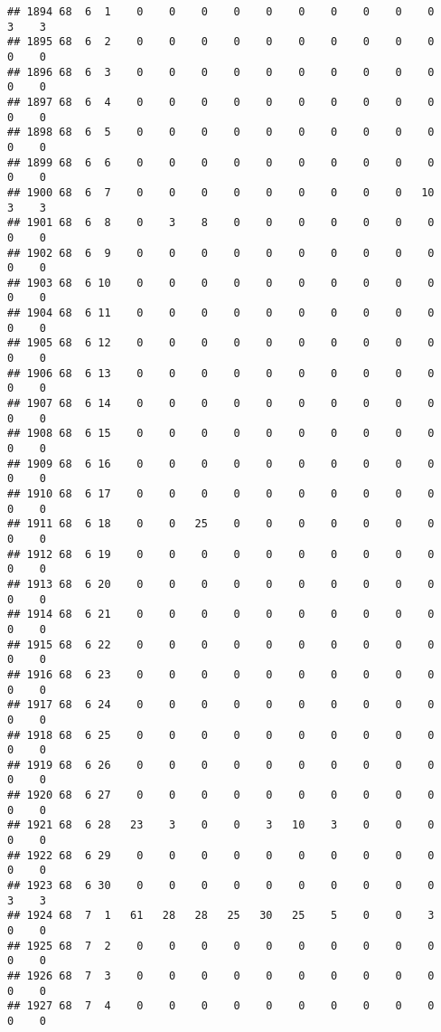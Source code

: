 \documentclass[]{article}
\begin{document}
\begin{verbatim}
## 1894 68  6  1    0    0    0    0    0    0    0    0    0    0    3    3
## 1895 68  6  2    0    0    0    0    0    0    0    0    0    0    0    0
## 1896 68  6  3    0    0    0    0    0    0    0    0    0    0    0    0
## 1897 68  6  4    0    0    0    0    0    0    0    0    0    0    0    0
## 1898 68  6  5    0    0    0    0    0    0    0    0    0    0    0    0
## 1899 68  6  6    0    0    0    0    0    0    0    0    0    0    0    0
## 1900 68  6  7    0    0    0    0    0    0    0    0    0   10    3    3
## 1901 68  6  8    0    3    8    0    0    0    0    0    0    0    0    0
## 1902 68  6  9    0    0    0    0    0    0    0    0    0    0    0    0
## 1903 68  6 10    0    0    0    0    0    0    0    0    0    0    0    0
## 1904 68  6 11    0    0    0    0    0    0    0    0    0    0    0    0
## 1905 68  6 12    0    0    0    0    0    0    0    0    0    0    0    0
## 1906 68  6 13    0    0    0    0    0    0    0    0    0    0    0    0
## 1907 68  6 14    0    0    0    0    0    0    0    0    0    0    0    0
## 1908 68  6 15    0    0    0    0    0    0    0    0    0    0    0    0
## 1909 68  6 16    0    0    0    0    0    0    0    0    0    0    0    0
## 1910 68  6 17    0    0    0    0    0    0    0    0    0    0    0    0
## 1911 68  6 18    0    0   25    0    0    0    0    0    0    0    0    0
## 1912 68  6 19    0    0    0    0    0    0    0    0    0    0    0    0
## 1913 68  6 20    0    0    0    0    0    0    0    0    0    0    0    0
## 1914 68  6 21    0    0    0    0    0    0    0    0    0    0    0    0
## 1915 68  6 22    0    0    0    0    0    0    0    0    0    0    0    0
## 1916 68  6 23    0    0    0    0    0    0    0    0    0    0    0    0
## 1917 68  6 24    0    0    0    0    0    0    0    0    0    0    0    0
## 1918 68  6 25    0    0    0    0    0    0    0    0    0    0    0    0
## 1919 68  6 26    0    0    0    0    0    0    0    0    0    0    0    0
## 1920 68  6 27    0    0    0    0    0    0    0    0    0    0    0    0
## 1921 68  6 28   23    3    0    0    3   10    3    0    0    0    0    0
## 1922 68  6 29    0    0    0    0    0    0    0    0    0    0    0    0
## 1923 68  6 30    0    0    0    0    0    0    0    0    0    0    3    3
## 1924 68  7  1   61   28   28   25   30   25    5    0    0    3    0    0
## 1925 68  7  2    0    0    0    0    0    0    0    0    0    0    0    0
## 1926 68  7  3    0    0    0    0    0    0    0    0    0    0    0    0
## 1927 68  7  4    0    0    0    0    0    0    0    0    0    0    0    0

\end{verbatim}
\end{document}
